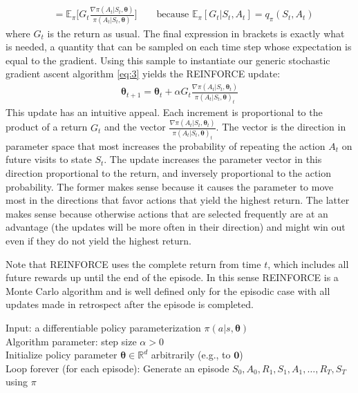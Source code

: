 {\begin{align*}
    &=\mathbb{E}_\pi\Big[G_t\frac{\nabla\pi(A_t|S_t, \bm{\theta})}{\pi(A_t|S_t, \bm{\theta})}\Big] \qquad\text{because $\mathbb{E}_\pi[G_t|S_t,A_t]=q_\pi(S_t, A_t)$}
\end{align*}
where $G_t$ is the return as usual. The final expression in brackets is exactly what is needed, a quantity that can be sampled on each time step whose expectation is equal to the gradient. Using this sample to instantiate our generic stochastic gradient ascent algorithm \ref{eq:3} yields the REINFORCE update:
\begin{align}\label{eq:4}
\bm{\theta}_{t+1} = \bm{\theta}_t + \alpha G_t\frac{\nabla\pi(A_t|S_t, \bm{\theta}_t)}{\pi(A_t|S_t, \bm{\theta})_t}
\end{align}
This update has an intuitive appeal. Each increment is proportional to the product of a return $G_t$ and the vector $\frac{\nabla\pi(A_t|S_t, \bm{\theta}_t)}{\pi(A_t|S_t, \bm{\theta})_t}$. The vector is the direction in parameter space that most increases the probability of repeating the action $A_t$ on future visits to state $S_t$.
The update increases the parameter vector in this direction proportional to the return, and inversely proportional to the action probability. The former makes sense because it causes the parameter to move most in the directions that favor actions that yield the highest return. The latter makes sense because otherwise actions that are selected frequently are at an advantage (the updates will be more often in their direction) and might win out even if they do not yield the highest return.

Note that REINFORCE uses the complete return from time $t$, which includes all future rewards up until the end of the episode. In this sense REINFORCE is a Monte Carlo algorithm and is well defined only for the episodic case with all updates made in retrospect after the episode is completed.

\begin{tcolorbox}[colback=black!7!white,colframe=black!75!white,title=\textbf{REINFORCE: Monte-Carlo Policy-Gradient Control (episodic) for $\pi_*$}]
Input: a differentiable policy parameterization $\pi(a|s,\bm{\theta})$\\
Algorithm parameter: step size $\alpha > 0$\\
Initialize policy parameter $\bm{\theta}\in\mathbb{R}^d$ arbitrarily (e.g., to $\bm{0}$)\\

Loop forever (for each episode):
    \qquad Generate an episode $S_0, A_0, R_1, S_1, A_1,\dots,R_T,S_T$ using $\pi$
    

\end{tcolorbox}}
